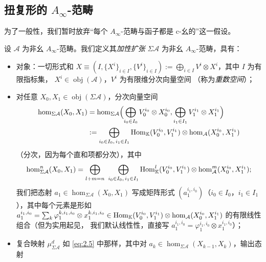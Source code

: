 \subsection{扭复形的 $A_\infty$-范畴}\label{sec:3.5}

为了一般性，我们暂时放弃“每个 $A_\infty$-范畴与函子都是 c-幺的”这一假设。

\begin{Def}\label{def:3.24}
设 $\mathcal A$ 为非幺 $A_\infty$-范畴。我们定义其\emph{加性扩张}
$\Sigma\mathcal A$ 为非幺 $A_\infty$-范畴，具有：
\begin{itemize}
  \item 对象：一切形式和
        $X\equiv(I,\{X^i\}_{i\in I},\{V^i\}_{i\in I}):=
        \bigoplus_{i\in I}V^i\otimes X^i$，其中 $I$ 为有限指标集，
        $X^i\in\operatorname{obj}(\mathcal A)$，$V^i$ 为有限维分次向量空间
        （称为\emph{重数空间}）；
  \item 对任意 $X_0,X_1\in\operatorname{obj}(\Sigma\mathcal A)$，分次向量空间
        \begin{equation}\label{eq:3.40}
          \begin{aligned}
            \hom_{\Sigma\mathcal A}(X_0,X_1)
            &=\hom_{\Sigma\mathcal A}\Bigl(\bigoplus_{i_0\in I_0}
            V_0^{i_0}\otimes X_0^{i_0},\bigoplus_{i_1\in I_1}
            V_1^{i_1}\otimes X_1^{i_1}\Bigr)\\
            &:=\bigoplus_{i_0\in I_0,\,i_1\in I_1}
            \operatorname{Hom}_{\mathbb K}(V_0^{i_0},V_1^{i_1})\otimes
            \hom_{\mathcal A}(X_0^{i_0},X_1^{i_1})
          \end{aligned}
        \end{equation}
        （分次，因为每个直和项都分次），其中
        \[
          \hom^n_{\Sigma\mathcal A}(X_0,X_1)=
          \bigoplus_{l+m=n}\ \bigoplus_{i_0\in I_0,\,i_1\in I_1}
          \operatorname{Hom}^l_{\mathbb K}(V_0^{i_0},V_1^{i_1})\otimes
          \hom^m_{\mathcal A}(X_0^{i_0},X_1^{i_1});
        \]
        我们把态射 $a_1\in\hom_{\Sigma\mathcal A}(X_0,X_1)$ 写成矩阵形式
        $(a_1^{i_1,i_0})$（$i_0\in I_0$，$i_1\in I_1$），其中每个元素是形如
        $a_1^{i_1,i_0}=\sum_k\varphi_1^{k,i_1,i_0}\otimes x_1^{k,i_1,i_0}
        \in\operatorname{Hom}_{\mathbb K}(V_0^{i_0},V_1^{i_1})\otimes
        \hom_{\mathcal A}(X_0^{i_0},X_1^{i_1})$ 的有限线性组合（但为实用起见，
        我们默认线性性，直接写
        $a_1^{i_1,i_0}=\varphi_1^{i_1,i_0}\otimes x_1^{i_1,i_0}$）；
  \item 复合映射 $\mu^d_{\Sigma\mathcal A}$ 如 \eqref{eq:2.5} 中那样，其中对
        $a_k\in\hom_{\Sigma\mathcal A}(X_{k-1},X_k)$，输出态射

\end{itemize}
\end{Def}
